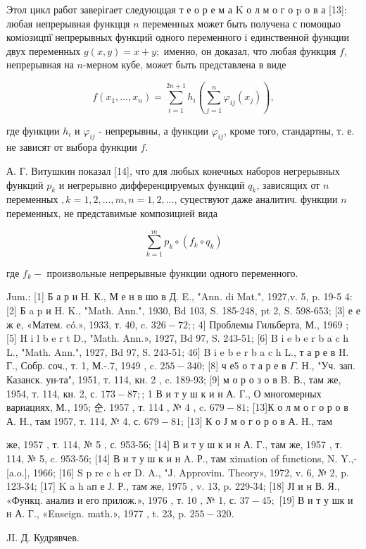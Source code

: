 \documentclass[10pt]{article}
\begin{document}
Этол цикл работ заверігает следуюццая т е о р е м а K о л м о г о p о в а [13]: любая непрерывная функцця $n$ переменных может быть получена с помощыо коміозицпї̈ непрерывных функций одного переменного і единственной функции двух переменных $g(x, y)=x+y ;$ именно, он доказал, что любая функция $f$, непрерывная на $n$-мерном кубе, может быть представлена в виде



\[

f\left(x_{1}, \ldots, x_{n}\right)=\sum_{i=1}^{2 n+1} h_{i}\left(\sum_{j=1}^{n} \varphi_{i j}\left(x_{j}\right)\right),

\]



где функции $h_{i}$ и $\varphi_{i j}$ - непрерывны, а функции $\varphi_{i j}$, кроме того, стандартны, т. е. не зависят от выбора функции $f$.



А. Г. Витушкин показал [14], что для любых конечных наборов негрерывных функций $p_{k}$ и негрерывно дифференцируемых функций $q_{k}$, зависящих от $n$ переменных $, k=1,2, \ldots, m, n=1,2, \ldots$, суцествуют даже аналитич. функции $n$ переменных, не представимые композицией вида



\[

\sum_{k=1}^{m} p_{k} \circ\left(f_{k} \circ q_{k}\right)

\]



где $f_{k}-$ произвольные непрерывные функции одного переменного.



Jum.: [1] Б а р и Н. К., М е н в шо в Д. E., "Ann. di Mat.", 1927,v. 5, p. 19-5 4: [2] Б a p и H. K., "Math. Ann.", 1930, Bd 103, S. 185-248, pt 2, S. 598-653; [3] е е ж е, «Матем. có.», 1933, т. 40, c. $326-72 ;$; 4] Проблемы Гильберта, М., 1969 ; [5] H i l b e r t D., "Math. Ann.», 1927, Bd 97, S. 243-51; [6] B i e b e r b a c h L., "Math. Ann.", 1927, Bd 97, S. 243-51; 46$]$ B i e b e r b a c h L., т а р е в H. Г., Собр. соч., т. 1, М.-.7, 1949 , c. $255-340$; [8] ч е5 о т а р е в $\Gamma$. Н., "Уч. зап. Казанск. ун-та", 1951, т. 114, кн. 2 , c. 189-93; [9] м о р о з о в B. В., там же, 1954, т. 114, кн. 2, с. $173-87 ;$; 1 В и т у ш к и н А. Г., О многомерных вариациях, М., 195; 순. 1957 , т. 114 , № 4 , c. $679-81$; [13]К о л м о г о р о в А. Н., там 1957, т. 114, № 4, с. $679-81$; [13] К о Ј м о г о р о в А. Н., там

же, 1957 , т. 114, № 5 , с. 953-56; [14] В и т у ш к и н А. Г., там же, 1957 , т. 114, № 5, c. 953-56; [14] В и т у ш к и н A. Р., там ximation of functions, N. Y.,-[a.o.], 1966; [16] S p re c h er D. A., "J. Approvim. Theory», 1972, v. 6, № 2, p. 123-34; [17] K a h aп е Ј. Р., там же, 1975 , v. 13, p. 229-34; [18] ЈІ и н В. Я., «Функц. анализ и его прилож.», 1976 , т. 10 , № 1, с. $37-45 ;$ [19] В и т у шк и н А. Г., «Enseign. math.», 1977 , t. 23, p. $255-320$.



JI. Д. Кудрявчев.
\end{document}
